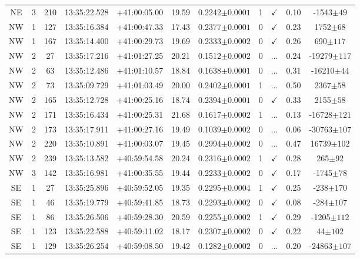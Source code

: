 \begin{table}
\begin{tabular}{ccccccccccc}
		NE & 3 & 210 & 13:35:22.528 & +41:00:05.00 & 19.59 & 0.2242$\pm{0.0001}$ & 1 & $\checkmark$ & 0.10 & -1543$\pm{49}$ \\
		NW & 1 & 127 & 13:35:16.384 & +41:00:47.33 & 17.43 & 0.2377$\pm{0.0001}$ & 0 & $\checkmark$ & 0.23 & 1752$\pm{68}$ \\
		NW & 1 & 167 & 13:35:14.400 & +41:00:29.73 & 19.69 & 0.2333$\pm{0.0002}$ & 0 & $\checkmark$ & 0.26 & 690$\pm{117}$ \\
		NW & 2 & 27 & 13:35:17.216 & +41:01:27.25 & 20.21 & 0.1512$\pm{0.0002}$ & 0 & ... & 0.24 & -19279$\pm{117}$ \\
		NW & 2 & 63 & 13:35:12.486 & +41:01:10.57 & 18.84 & 0.1638$\pm{0.0001}$ & 0 & ... & 0.31 & -16210$\pm{44}$ \\
		NW & 2 & 73 & 13:35:09.729 & +41:01:03.49 & 20.00 & 0.2402$\pm{0.0001}$ & 1 & ... & 0.50 & 2367$\pm{58}$ \\
		NW & 2 & 165 & 13:35:12.728 & +41:00:25.16 & 18.74 & 0.2394$\pm{0.0001}$ & 0 & $\checkmark$ & 0.33 & 2155$\pm{58}$ \\
		NW & 2 & 171 & 13:35:16.434 & +41:00:25.31 & 21.68 & 0.1617$\pm{0.0002}$ & 1 & ... & 0.13 & -16728$\pm{121}$ \\
		NW & 2 & 173 & 13:35:17.911 & +41:00:27.16 & 19.49 & 0.1039$\pm{0.0002}$ & 0 & ... & 0.06 & -30763$\pm{107}$ \\
		NW & 2 & 220 & 13:35:10.891 & +41:00:03.07 & 19.45 & 0.2994$\pm{0.0002}$ & 0 & ... & 0.47 & 16739$\pm{102}$ \\
		NW & 2 & 239 & 13:35:13.582 & +40:59:54.58 & 20.24 & 0.2316$\pm{0.0002}$ & 1 & $\checkmark$ & 0.28 & 265$\pm{92}$ \\
		NW & 3 & 142 & 13:35:16.981 & +41:00:35.55 & 19.44 & 0.2233$\pm{0.0002}$ & 0 & $\checkmark$ & 0.17 & -1745$\pm{78}$ \\
		SE & 1 & 27 & 13:35:25.896 & +40:59:52.05 & 19.35 & 0.2295$\pm{0.0004}$ & 1 & $\checkmark$ & 0.25 & -238$\pm{170}$ \\
		SE & 1 & 46 & 13:35:19.779 & +40:59:41.85 & 18.73 & 0.2293$\pm{0.0002}$ & 0 & $\checkmark$ & 0.08 & -284$\pm{107}$ \\
		SE & 1 & 86 & 13:35:26.506 & +40:59:28.30 & 20.59 & 0.2255$\pm{0.0002}$ & 1 & $\checkmark$ & 0.29 & -1205$\pm{112}$ \\
		SE & 1 & 123 & 13:35:22.588 & +40:59:11.02 & 18.17 & 0.2307$\pm{0.0002}$ & 0 & $\checkmark$ & 0.22 & 44$\pm{102}$ \\
		SE & 1 & 129 & 13:35:26.254 & +40:59:08.50 & 19.42 & 0.1282$\pm{0.0002}$ & 0 & ... & 0.20 & -24863$\pm{107}$ \\

\end{tabular}
\end{table}
